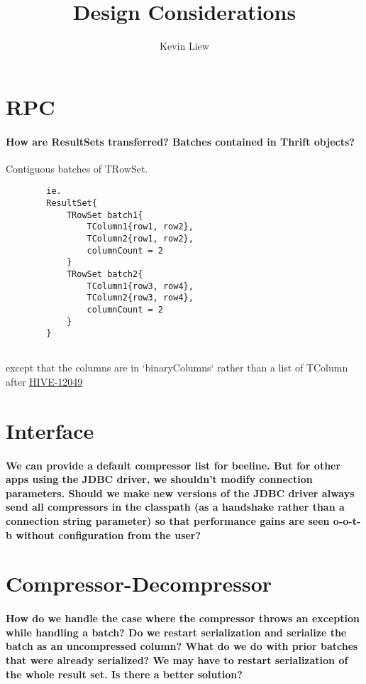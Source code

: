 \documentclass[11pt,a4paper]{article}
\title{Design Considerations}
\author{Kevin Liew}
\begin{document}
\maketitle

\section{RPC}
	\paragraph{How are ResultSets transferred? Batches contained in Thrift objects?}
	Contiguous batches of TRowSet.
	\begin{verbatim}
		ie.
		ResultSet{
		    TRowSet batch1{
		        TColumn1{row1, row2},
		        TColumn2{row1, row2},
		        columnCount = 2
		    }
		    TRowSet batch2{
		        TColumn1{row3, row4},
		        TColumn2{row3, row4},
		        columnCount = 2
		    }
		}
		
	\end{verbatim}
	except that the columns are in `binaryColumns` rather than a list of TColumn after \href{https://issues.apache.org/jira/browse/HIVE-12049}{HIVE-12049}

\section{Interface}
	\paragraph{We can provide a default compressor list for beeline. But for other apps using the JDBC driver, we shouldn't modify connection parameters. Should we make new versions of the JDBC driver always send all compressors in the classpath (as a handshake rather than a connection string parameter) so that performance gains are seen o-o-t-b without configuration from the user?}

\section{Compressor-Decompressor}
	\paragraph{How do we handle the case where the compressor throws an exception while handling a batch? Do we restart serialization and serialize the batch as an uncompressed column? What do we do with prior batches that were already serialized? We may have to restart serialization of the whole result set. Is there a better solution?}
	
\end{document}
